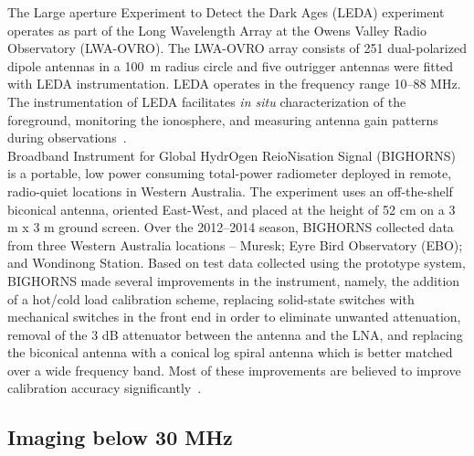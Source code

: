             
	    The Large aperture Experiment to Detect the Dark Ages (LEDA) experiment operates as part of the Long Wavelength Array at the Owens Valley Radio Observatory (LWA-OVRO). The LWA-OVRO array consists of 251 dual-polarized dipole antennas in a \SI{100}{\meter} radius circle and five outrigger antennas were fitted with LEDA instrumentation. LEDA operates in the frequency range 10–88 MHz. The instrumentation of LEDA facilitates \textit{in situ} characterization of the foreground, monitoring the ionosphere, and measuring antenna gain patterns during observations~\citep{2012JAI.....150004T, 2018MNRAS.478.4193P}.\\
	    
	    Broadband Instrument for Global HydrOgen ReioNisation Signal
	    (BIGHORNS) is a portable, low power consuming total-power radiometer deployed in remote, radio-quiet locations in Western Australia. The experiment uses an off-the-shelf biconical antenna, oriented East-West, and placed at the height of 52 cm on a 3 m x 3 m ground screen. Over the 2012–2014 season, BIGHORNS collected data from three Western Australia locations – Muresk; Eyre Bird Observatory (EBO); and Wondinong Station. Based on test data collected using the prototype system, BIGHORNS made several improvements in the instrument, namely, the addition of a hot/cold load calibration scheme, replacing solid-state switches with mechanical switches in the front end in order to eliminate unwanted attenuation, removal of the 3 dB attenuator between the antenna and the LNA, and replacing the biconical antenna with a conical log spiral antenna which is better matched over a wide frequency band. Most of these improvements are believed to improve calibration accuracy significantly~\citep{2015PASA...32....4S}.
	    
	    \subsection{Imaging below 30 MHz}
	    
